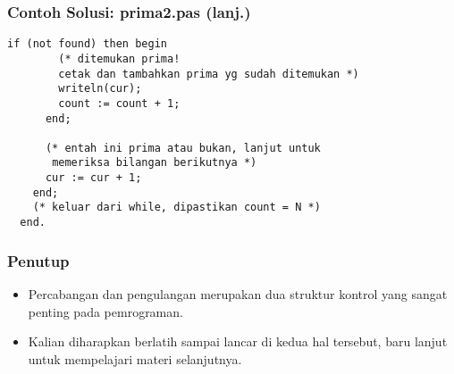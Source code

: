\begin{frame}[fragile]
\frametitle{Contoh Solusi: prima2.pas (lanj.)}
\begin{lstlisting}[gobble=2]
      if (not found) then begin
        (* ditemukan prima!
        cetak dan tambahkan prima yg sudah ditemukan *)
        writeln(cur);
        count := count + 1;
      end;

      (* entah ini prima atau bukan, lanjut untuk
       memeriksa bilangan berikutnya *)
      cur := cur + 1;
    end;
    (* keluar dari while, dipastikan count = N *)
  end.
\end{lstlisting}
\end{frame}

\begin{frame}
\frametitle{Penutup}
\begin{itemize}
  \item Percabangan dan pengulangan merupakan dua struktur kontrol yang sangat penting pada pemrograman.
  \item Kalian diharapkan berlatih sampai lancar di kedua hal tersebut, baru lanjut untuk mempelajari materi selanjutnya.
\end{itemize}
\end{frame}


